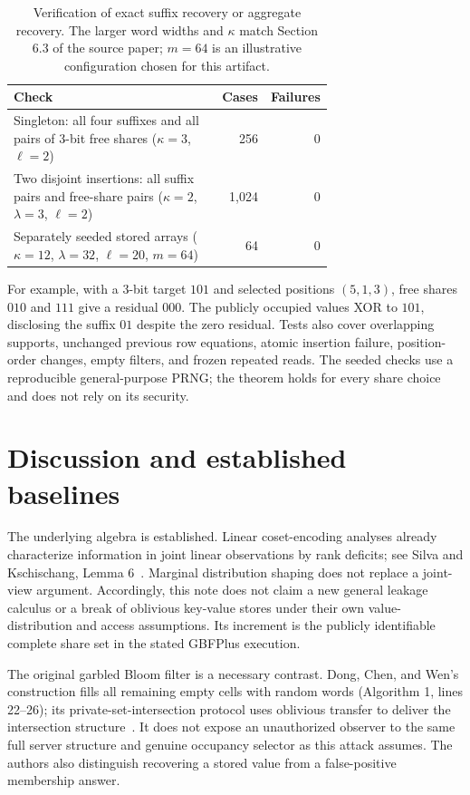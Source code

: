 \documentclass[11pt]{article}
\begin{document}
\begin{table}[ht]
\centering
\small
\begin{tabular}{@{}>{\raggedright\arraybackslash}p{0.70\linewidth}rr@{}}
\toprule
Check & Cases & Failures\\
\midrule
Singleton: all four suffixes and all pairs of 3-bit free shares
($\kappa=3$, $\ell=2$) & 256 & 0\\
Two disjoint insertions: all suffix pairs and free-share pairs
($\kappa=2$, $\lambda=3$, $\ell=2$) & 1,024 & 0\\
Separately seeded stored arrays ($\kappa=12$, $\lambda=32$,
$\ell=20$, $m=64$) & 64 & 0\\
\bottomrule
\end{tabular}
\caption{Verification of exact suffix recovery or aggregate recovery.
The larger word widths and $\kappa$ match Section 6.3 of the source paper;
$m=64$ is an illustrative configuration chosen for this artifact.}
\label{tab:checks}
\end{table}

For example, with a 3-bit target $101$ and selected positions $(5,1,3)$,
free shares $010$ and $111$ give a residual $000$. The publicly occupied
values XOR to $101$, disclosing the suffix $01$ despite the zero residual.
Tests also cover overlapping supports, unchanged previous row equations,
atomic insertion failure, position-order changes, empty filters, and frozen
repeated reads. The seeded checks use a reproducible general-purpose PRNG;
the theorem holds for every share choice and does not rely on its security.

\section{Discussion and established baselines}

The underlying algebra is established. Linear coset-encoding analyses already
characterize information in joint linear observations by rank deficits; see
Silva and Kschischang, Lemma 6~\cite{silva2011universal}. Marginal distribution
shaping does not replace a joint-view argument. Accordingly, this note does not
claim a new general leakage calculus or a break of oblivious key-value stores
under their own value-distribution and access assumptions. Its increment is
the publicly identifiable complete share set in the stated GBFPlus execution.

The original garbled Bloom filter is a necessary contrast. Dong, Chen, and
Wen's construction fills all remaining empty cells with random words
(Algorithm 1, lines 22--26); its private-set-intersection protocol uses
oblivious transfer to deliver the intersection structure~\cite{dong2013gbf}.
It does not expose an unauthorized observer to the same full server structure
and genuine occupancy selector as this attack assumes. The authors also
distinguish recovering a stored value from a false-positive membership answer.
\end{document}
